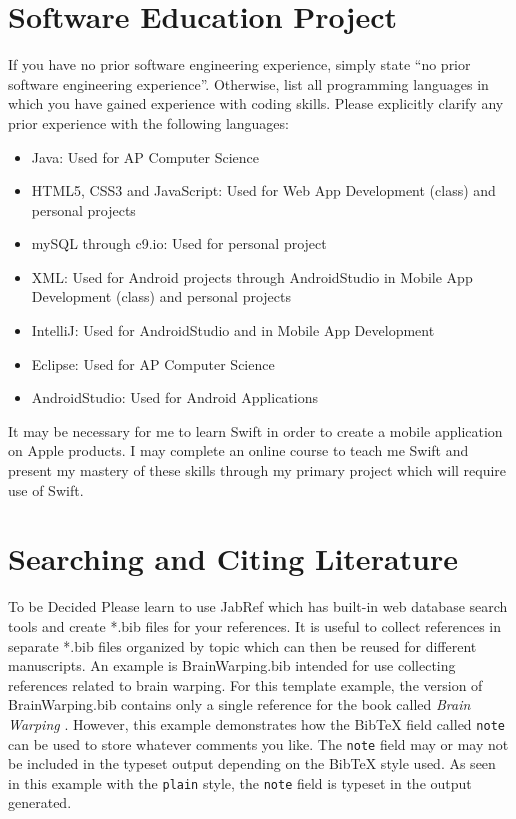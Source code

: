 \documentclass[12pt]{article}
\begin{document}
\section{Software Education Project}

If you have no prior software engineering experience, simply state ``no prior software engineering experience''.  Otherwise, list all programming languages in which you have gained experience with coding skills. Please explicitly clarify any prior experience with the following languages:
\begin{itemize}
\item Java: Used for AP Computer Science
\item HTML5, CSS3 and JavaScript: Used for Web App Development (class) and personal projects
\item mySQL through c9.io: Used for personal project
\item XML: Used for Android projects through AndroidStudio in Mobile App Development (class) and personal projects
\end{itemize}

\begin{itemize}
\item IntelliJ: Used for AndroidStudio and in Mobile App Development
\item Eclipse: Used for AP Computer Science
\item AndroidStudio: Used for Android Applications
\end{itemize}

It may be necessary for me to learn Swift in order to create a mobile application on Apple products. I may complete an online course to teach me Swift and present my mastery of these skills through my primary project which will require use of Swift. 

\section{Searching and Citing Literature}
To be Decided
Please learn to use JabRef which has built-in web database search tools and create *.bib files for your references. It is useful to collect references in separate *.bib files organized by topic which can then be reused for different manuscripts. An example is BrainWarping.bib intended for use collecting references related to brain warping. For this template example, the version of BrainWarping.bib contains only a single reference for the book called \emph{Brain Warping} \cite{Toga1988}.  However, this example demonstrates how the BibTeX field called \texttt{note} can be used to store whatever comments you like.  The \texttt{note}  field may or may not be included in the typeset output depending on the BibTeX style used. As seen in this example with the \texttt{plain} style, the \texttt{note} field is typeset in the output generated. 





\end{document}
